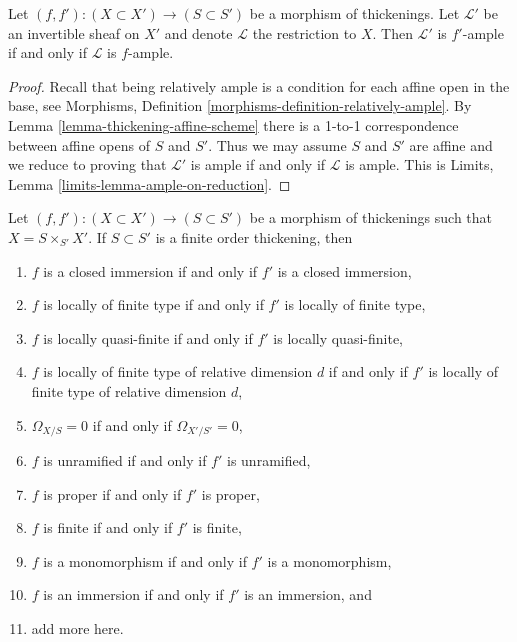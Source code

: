 \begin{lemma}
\label{lemma-thicken-property-relatively-ample}
Let $(f, f') : (X \subset X') \to (S \subset S')$ be a morphism
of thickenings. Let $\mathcal{L}'$ be an invertible sheaf on $X'$
and denote $\mathcal{L}$ the restriction to $X$.
Then $\mathcal{L}'$ is $f'$-ample if and only if
$\mathcal{L}$ is $f$-ample.
\end{lemma}

\begin{proof}
Recall that being relatively ample is a condition for each
affine open in the base, see
Morphisms, Definition \ref{morphisms-definition-relatively-ample}.
By Lemma \ref{lemma-thickening-affine-scheme}
there is a 1-to-1 correspondence between
affine opens of $S$ and $S'$.
Thus we may assume $S$ and $S'$ are affine
and we reduce to proving that
$\mathcal{L}'$ is ample if and only if
$\mathcal{L}$ is ample.
This is Limits, Lemma \ref{limits-lemma-ample-on-reduction}.
\end{proof}

\begin{lemma}
\label{lemma-thicken-property-morphisms-cartesian}
Let $(f, f') : (X \subset X') \to (S \subset S')$ be a morphism
of thickenings such that $X = S \times_{S'} X'$. If $S \subset S'$
is a finite order thickening, then
\begin{enumerate}
\item $f$ is a closed immersion if and only if $f'$ is a closed immersion,
\item $f$ is locally of finite type if and only if $f'$ is
locally of finite type,
\item $f$ is locally quasi-finite if and only if $f'$ is locally
quasi-finite,
\item $f$ is locally of finite type of relative dimension $d$ if and
only if $f'$ is locally of finite type of relative dimension $d$,
\item $\Omega_{X/S} = 0$ if and only if $\Omega_{X'/S'} = 0$,
\item $f$ is unramified if and only if $f'$ is unramified,
\item $f$ is proper if and only if $f'$ is proper,
\item $f$ is finite if and only if $f'$ is finite,
\item $f$ is a monomorphism if and only if $f'$ is a monomorphism,
\item $f$ is an immersion if and only if $f'$ is an immersion, and
\item add more here.
\end{enumerate}
\end{lemma}

